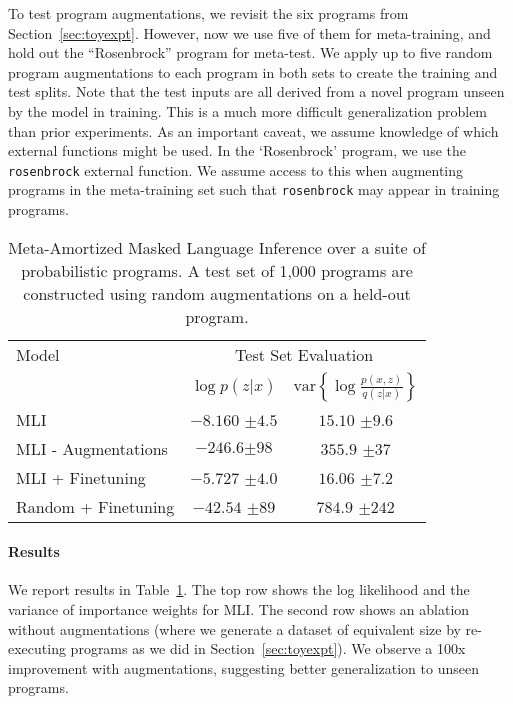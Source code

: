 To test program augmentations, we revisit the six  programs from Section~\ref{sec:toyexpt}. However, now we use five of them for meta-training, and hold out the ``Rosenbrock'' program for meta-test. We apply up to five random program augmentations to each program in both sets to create the training and test splits. Note that the test inputs are all derived from a novel program unseen by the model in training.
This is a much more difficult generalization problem than prior experiments. As an important caveat, we assume knowledge of which external functions might be used. In the `Rosenbrock' program, we use the \texttt{rosenbrock} external function. We assume access to this when augmenting programs in the meta-training set such that \texttt{rosenbrock} may appear in training programs.

\begin{table}[b!]
\centering
\small
\begin{tabular}{lcc}
\toprule
Model & \multicolumn{2}{c}{Test Set Evaluation} \\
& $\log p(z|x)$ & $\text{var}\left\{\log \frac{p(x,z)}{q(z|x)}\right\}$ \\
\midrule
MLI & $-8.160$ {\tiny $\pm 4.5$} & $15.10$ {\tiny $\pm 9.6$ } \\
MLI - Augmentations & $-246.6${\tiny $\pm 98$} & $355.9$ {\tiny $\pm 37$} \\
MLI + Finetuning & $-5.727$ {\tiny $\pm 4.0$} & $16.06$ {\tiny $\pm 7.2$} \\
Random + Finetuning & $-42.54$ {\tiny $\pm 89$} & $784.9$ {\tiny $\pm 242$}  \\
\bottomrule
\end{tabular}
\caption{Meta-Amortized Masked Language Inference over a suite of probabilistic programs. A test set of 1,000 programs are constructed using random augmentations on a held-out program.}
\label{tab:toy:augment}
\end{table}

\paragraph{Results} We report results in Table~\ref{tab:toy:augment}. The top row shows the log likelihood and the variance of importance weights for MLI. The second row shows an ablation without augmentations (where we generate a dataset of equivalent size by re-executing programs as we did in Section~\ref{sec:toyexpt}). We observe a 100x improvement with augmentations, suggesting better generalization to unseen programs.

